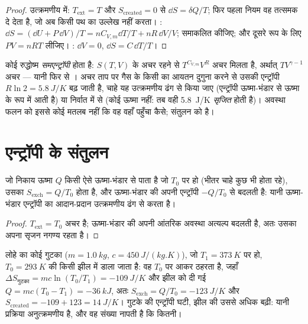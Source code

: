\begin{proof}
उत्क्रमणीय में: $T_{\mathrm{ext}} = T$ और $S_{\mathrm{created}} = 0$ से $\dd S =
\delta Q/T$; फिर पहला नियम वह तत्समक दे देता है, जो अब किसी पथ का उल्लेख
नहीं करता। : $\dd S = (\dd U + P\,\dd V)/T = nC_{V,m}\dd T/T
+ nR\,\dd V/V$; समाकलित कीजिए; और दूसरे रूप के लिए $PV = nRT$ लीजिए।
: $\dd V = 0$, $\dd S = C\,\dd T/T$।
\end{proof}

\begin{example}[सूत्रों को पढ़ना]\label{ex:b1:second-law-entropy:formulas}
कोई रुद्धोष्म  \emph{समएन्ट्रॉपी} होता है: $S(T, V)$ के
अचर रहने से $T^{C_{V,m}}V^R$ अचर मिलता है, अर्थात् $TV^{\gamma - 1}$ अचर ---
यानी फिर से । अचर ताप पर गैस के किसी  का आयतन दुगुना
करने से उसकी एन्ट्रॉपी $R\ln2 = \qty{5.8}{J/K}$ बढ़ जाती है, चाहे यह
उत्क्रमणीय ढंग से किया जाए (एन्ट्रॉपी ऊष्मा-भंडार से ऊष्मा के रूप में आती
है) या निर्वात में  से (कोई ऊष्मा नहीं: तब वही \qty{5.8}{J/K}
\emph{सृजित} होती है)। अवस्था फलन को इससे कोई मतलब नहीं कि वह वहाँ
पहुँचा कैसे; संतुलन को है।
\end{example}

\section{एन्ट्रॉपी के संतुलन}

\begin{proposition}[ऊष्मा-भंडार के साथ ऊष्मा का आदान-प्रदान]\label{prop:b1:second-law-entropy:thermostat}
जो निकाय ऊष्मा $Q$ किसी ऐसे ऊष्मा-भंडार से पाता है जो $T_0$ पर हो (भीतर
चाहे कुछ भी होता रहे), उसका $S_{\mathrm{exch}} = Q/T_0$ होता है, और ऊष्मा-भंडार की अपनी
एन्ट्रॉपी $-Q/T_0$ से बदलती है: यानी ऊष्मा-भंडार एन्ट्रॉपी का आदान-प्रदान
उत्क्रमणीय ढंग से करता है।
\end{proposition}

\begin{proof}
$T_{\mathrm{ext}} = T_0$ अचर है; ऊष्मा-भंडार की अपनी आंतरिक अवस्था अत्यल्प
बदलती है, अतः उसका अपना सृजन नगण्य रहता है।
\end{proof}

\begin{example}[ठंडी झील में गरम पिंड]\label{ex:b1:second-law-entropy:quench}
लोहे का कोई गुटका ($m = \qty{1.0}{kg}$, $c = \qty{450}{J/(kg.K)}$), जो $T_1 =
\qty{373}{K}$ पर हो, $T_0 = \qty{293}{K}$ की किसी झील में डाला जाता है: वह $T_0$ पर आकर ठहरता है,
जहाँ $\Delta S_{\text{गुटका}} = mc\ln(T_0/T_1) = \qty{-109}{J/K}$ और झील को दी गई $Q =
mc(T_0 - T_1) = \qty{-36}{kJ}$, अतः $S_{\mathrm{exch}} =
Q/T_0 = \qty{-123}{J/K}$ और $S_{\mathrm{created}} = -109 + 123 = \qty{+14}{J/K}$।
गुटके की एन्ट्रॉपी घटी, झील की उससे अधिक बढ़ी: यानी प्रक्रिया
अनुत्क्रमणीय है, और वह संख्या नापती है कि कितनी।
\end{example}

